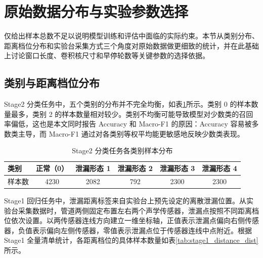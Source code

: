 \section{原始数据分布与实验参数选择}

仅给出样本总数不足以说明模型训练和评估中面临的实际约束。本节从类别分布、距离档位分布和实验台采集方式三个角度对原始数据做更细致的统计，并在此基础上讨论窗口长度、卷积核尺寸和早停轮数等关键参数的选择依据。

\subsection{类别与距离档位分布}

Stage2 分类任务中，五个类别的分布并不完全均衡，如表\ref{tab:stage2_label_dist}所示。类别 0 的样本数量最多，类别 2 的样本数量相对较少。类别不均衡可能导致模型对少数类的召回率偏低，这也是本文同时报告 Accuracy 和 Macro-F1 的原因：Accuracy 容易被多数类主导，而 Macro-F1 通过对各类别等权平均能更敏感地反映少数类表现。

\begin{table}[!htbp]
  \centering
  \caption{Stage2 分类任务各类别样本分布}
  \label{tab:stage2_label_dist}
  \vspace{0.5em}
  \wuhao
  \begin{tabular}{lccccc}
    \toprule
    类别 & 正常（0） & 泄漏形态 1 & 泄漏形态 2 & 泄漏形态 3 & 泄漏形态 4 \\
    \midrule
    样本数 & 4230 & 2082 & 792 & 2300 & 2300 \\
    \bottomrule
  \end{tabular}
\end{table}

Stage1 回归任务中，泄漏距离标签来自实验台上预先设定的离散泄漏位置。从实验台采集数据时，管道两侧固定布置左右两个声学传感器，泄漏点按照不同距离档位依次设置。以两传感器连线方向建立一维坐标轴，正值表示泄漏点偏向右侧传感器，负值表示偏向左侧传感器，零值表示泄漏点位于传感器连线中点附近。根据 Stage1 全量清单统计，各距离档位的具体样本数量如表\ref{tab:stage1_distance_dist}所示。

\begin{table}[!htbp]
  \centering
  \caption{Stage1 回归任务各距离档位样本分布}
  \label{tab:stage1_distance_dist}
  \vspace{0.5em}
  \wuhao
\end{table}

